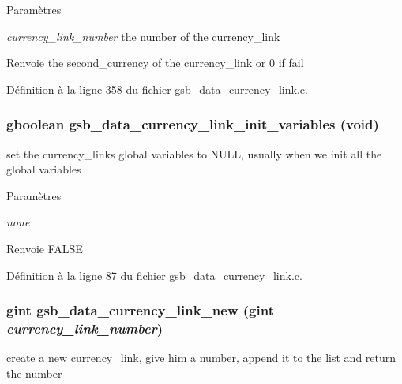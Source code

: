 \begin{DoxyParams}{Paramètres}
\item[{\em currency\_\-link\_\-number}]the number of the currency\_\-link\end{DoxyParams}
\begin{DoxyReturn}{Renvoie}
the second\_\-currency of the currency\_\-link or 0 if fail 
\end{DoxyReturn}


Définition à la ligne 358 du fichier gsb\_\-data\_\-currency\_\-link.c.

\subsubsection[{gsb\_\-data\_\-currency\_\-link\_\-init\_\-variables}]{\setlength{\rightskip}{0pt plus 5cm}gboolean gsb\_\-data\_\-currency\_\-link\_\-init\_\-variables (void)}\label{gsb__data__currency__link_8h_a4cd0e66deb9185816119a0ddd973f1c6}
set the currency\_\-links global variables to NULL, usually when we init all the global variables


\begin{DoxyParams}{Paramètres}
\item[{\em none}]\end{DoxyParams}
\begin{DoxyReturn}{Renvoie}
FALSE 
\end{DoxyReturn}


Définition à la ligne 87 du fichier gsb\_\-data\_\-currency\_\-link.c.

\subsubsection[{gsb\_\-data\_\-currency\_\-link\_\-new}]{\setlength{\rightskip}{0pt plus 5cm}gint gsb\_\-data\_\-currency\_\-link\_\-new (gint {\em currency\_\-link\_\-number})}\label{gsb__data__currency__link_8h_a78bdeb826c13c39ba178ac66c41f17aa}
create a new currency\_\-link, give him a number, append it to the list and return the number


